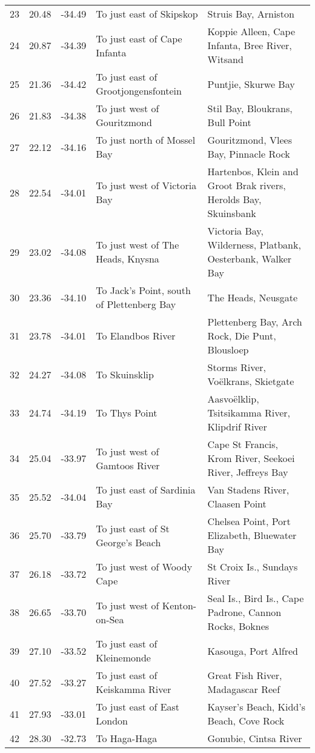 \documentclass[10pt,A4,]{article}
\begin{document}
\begin{tiny}
\begin{center}
\begin{longtable}{|r|r|r|l|p{6cm}|}
23 & 20.48 & -34.49 & To just east of Skipskop & Struis Bay, Arniston \\
24 & 20.87 & -34.39 & To just east of Cape Infanta & Koppie Alleen, Cape Infanta, Bree River, Witsand \\
25 & 21.36 & -34.42 & To just east of Grootjongensfontein & Puntjie, Skurwe Bay \\
26 & 21.83 & -34.38 & To just west of Gouritzmond & Stil Bay, Bloukrans, Bull Point \\
27 & 22.12 & -34.16 & To just north of Mossel Bay & Gouritzmond, Vlees Bay, Pinnacle Rock \\
28 & 22.54 & -34.01 & To just west of Victoria Bay & Hartenbos, Klein and Groot Brak rivers, Herolds Bay, Skuinsbank \\
29 & 23.02 & -34.08 & To just west of The Heads, Knysna & Victoria Bay, Wilderness, Platbank, Oesterbank, Walker Bay \\
30 & 23.36 & -34.10 & To Jack’s Point, south of Plettenberg Bay  & The Heads, Neusgate \\
31 & 23.78 & -34.01 & To Elandbos River & Plettenberg Bay, Arch Rock, Die Punt, Blousloep \\
32 & 24.27 & -34.08 & To Skuinsklip & Storms River, Voëlkrans, Skietgate \\
33 & 24.74 & -34.19 & To Thys Point & Aasvoëlklip, Tsitsikamma River, Klipdrif River \\
34 & 25.04 & -33.97 & To just west of Gamtoos River & Cape St Francis, Krom River, Seekoei River, Jeffreys Bay \\
35 & 25.52 & -34.04 & To just east of Sardinia Bay & Van Stadens River, Claasen Point \\
36 & 25.70 & -33.79 & To just east of St George’s Beach & Chelsea Point, Port Elizabeth, Bluewater Bay \\
37 & 26.18 & -33.72 & To just west of Woody Cape & St Croix Is., Sundays River \\
38 & 26.65 & -33.70 & To just west of Kenton-on-Sea & Seal Is., Bird Is., Cape Padrone, Cannon Rocks, Boknes \\
39 & 27.10 & -33.52 & To just east of Kleinemonde & Kasouga, Port Alfred \\
40 & 27.52 & -33.27 & To just east of Keiskamma River & Great Fish River, Madagascar Reef \\
41 & 27.93 & -33.01 & To just east of East London & Kayser’s Beach, Kidd’s Beach, Cove Rock \\
42 & 28.30 & -32.73 & To Haga-Haga & Gonubie, Cintsa River \\

\end{longtable}
\end{center}
\end{tiny}
\end{document}

